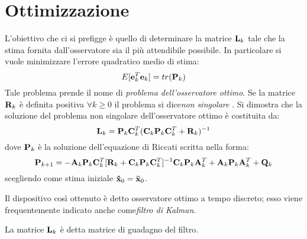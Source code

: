 \section{Ottimizzazione}
L'obiettivo che ci si prefigge è quello di determinare la matrice $\mathbf{L}_k$ tale che la stima fornita dall'osservatore sia il più attendibile possibile.
In particolare si vuole minimizzare l'errore quadratico medio di stima:
\[E[\mathbf{e}_k^T\mathbf{e}_k]=tr(\mathbf{P}_k)\]
Tale problema prende il nome di \textit{problema dell'osservatore ottimo}.
Se la matrice $\mathbf{R}_k$ è definita positiva $ \forall k \geq 0$ il problema si dice\textit{non singolare }.
Si dimostra \citep{kalmanbucy} che la soluzione del problema non singolare dell'osservatore ottimo è costituita da:
\[\mathbf{L}_k = \mathbf{P}_k\mathbf{C}_k^T(\mathbf{C}_k\mathbf{P}_k\mathbf{C}_k^T + \mathbf{R}_k)^{-1}\]
dove $\mathbf{P}_k$ è la soluzione dell'equazione di Riccati scritta nella forma:
\[\mathbf{P}_{k+1}=-\mathbf{A}_k\mathbf{P}_k\mathbf{C}_k^T[\mathbf{R}_k+\mathbf{C}_k\mathbf{P}_k\mathbf{C}_k^T]^{-1}\mathbf{C}_k\mathbf{P}_k\mathbf{A}_k^T+\mathbf{A}_k\mathbf{P}_k\mathbf{A}_k^T+\mathbf{Q}_k\]
scegliendo come stima iniziale $\mathbf{\hat{x}}_0=\mathbf{\bar{x}}_0$.

Il dispositivo così ottenuto è detto osservatore ottimo a tempo discreto; esso viene frequentemente indicato anche come\textit{filtro di Kalman}.

La matrice $\mathbf{L}_k$ è detta matrice di guadagno del filtro.   
\newpage